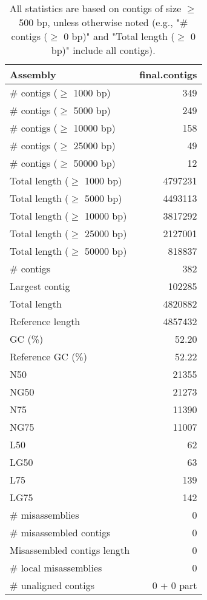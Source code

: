 \documentclass[12pt,a4paper]{article}
\begin{document}
\begin{table}[ht]
\begin{center}
\caption{All statistics are based on contigs of size $\geq$ 500 bp, unless otherwise noted (e.g., "\# contigs ($\geq$ 0 bp)" and "Total length ($\geq$ 0 bp)" include all contigs).}
\begin{tabular}{|l*{1}{|r}|}
\hline
Assembly & final.contigs \\ \hline
\# contigs ($\geq$ 1000 bp) & 349 \\ \hline
\# contigs ($\geq$ 5000 bp) & 249 \\ \hline
\# contigs ($\geq$ 10000 bp) & 158 \\ \hline
\# contigs ($\geq$ 25000 bp) & 49 \\ \hline
\# contigs ($\geq$ 50000 bp) & 12 \\ \hline
Total length ($\geq$ 1000 bp) & 4797231 \\ \hline
Total length ($\geq$ 5000 bp) & 4493113 \\ \hline
Total length ($\geq$ 10000 bp) & 3817292 \\ \hline
Total length ($\geq$ 25000 bp) & 2127001 \\ \hline
Total length ($\geq$ 50000 bp) & 818837 \\ \hline
\# contigs & 382 \\ \hline
Largest contig & 102285 \\ \hline
Total length & 4820882 \\ \hline
Reference length & 4857432 \\ \hline
GC (\%) & 52.20 \\ \hline
Reference GC (\%) & 52.22 \\ \hline
N50 & 21355 \\ \hline
NG50 & 21273 \\ \hline
N75 & 11390 \\ \hline
NG75 & 11007 \\ \hline
L50 & 62 \\ \hline
LG50 & 63 \\ \hline
L75 & 139 \\ \hline
LG75 & 142 \\ \hline
\# misassemblies & 0 \\ \hline
\# misassembled contigs & 0 \\ \hline
Misassembled contigs length & 0 \\ \hline
\# local misassemblies & 0 \\ \hline
\# unaligned contigs & 0 + 0 part \\ \hline

\end{tabular}
\end{center}
\end{table}
\end{document}
